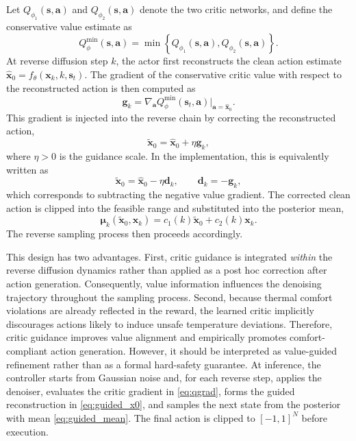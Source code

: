 \documentclass[lettersize,journal]{IEEEtran}
\theoremstyle{nonumberplain}     \theoremheaderfont{\bfseries\itshape}     \theorembodyfont{\normalfont}     \theoremseparator{:}     \theoremsymbol{\ensuremath{\blacksquare}}     \newtheorem{proof}{Proof}
\theoremstyle{plain}     \theoremheaderfont{\bfseries\itshape}     \theorembodyfont{\normalfont}     \theoremseparator{:}     \theoremsymbol{\ensuremath{\blacksquare}}     \newtheorem{remark}{Remark}
\begin{document}
Let $Q_{\phi_1}(\mathbf{s},\mathbf{a})$ and $Q_{\phi_2}(\mathbf{s},\mathbf{a})$ denote the two critic networks, and define the conservative value estimate as
\begin{equation}
Q_{\phi}^{\min}(\mathbf{s},\mathbf{a})
=
\min\left\{
Q_{\phi_1}(\mathbf{s},\mathbf{a}),
Q_{\phi_2}(\mathbf{s},\mathbf{a})
\right\}.
\label{eq:qmin}
\end{equation}
At reverse diffusion step $k$, the actor first reconstructs the clean action estimate $\hat{\mathbf{x}}_0 = f_\theta(\mathbf{x}_k,k,\mathbf{s}_t)$. The gradient of the conservative critic value with respect to the reconstructed action is then computed as
\begin{equation}
\mathbf{g}_k
=
\nabla_{\mathbf{a}} Q_{\phi}^{\min}(\mathbf{s}_t,\mathbf{a})
\big|_{\mathbf{a}=\hat{\mathbf{x}}_0}.
\label{eq:qgrad}
\end{equation}
This gradient is injected into the reverse chain by correcting the reconstructed action,
\begin{equation}
\tilde{\mathbf{x}}_0
=
\hat{\mathbf{x}}_0 + \eta \mathbf{g}_k,
\label{eq:guided_x0}
\end{equation}
where $\eta > 0$ is the guidance scale. In the implementation, this is equivalently written as
\begin{equation}
\tilde{\mathbf{x}}_0
=
\hat{\mathbf{x}}_0 - \eta \mathbf{d}_k,
\qquad
\mathbf{d}_k = -\mathbf{g}_k,
\label{eq:guided_impl}
\end{equation}
which corresponds to subtracting the negative value gradient. The corrected clean action is clipped into the feasible range and substituted into the posterior mean,
\begin{equation}
\boldsymbol{\mu}_k(\tilde{\mathbf{x}}_0,\mathbf{x}_k)
=
c_1(k)\tilde{\mathbf{x}}_0 + c_2(k)\mathbf{x}_k.
\label{eq:guided_mean}
\end{equation}
The reverse sampling process then proceeds accordingly.

This design has two advantages. First, critic guidance is integrated \emph{within} the reverse diffusion dynamics rather than applied as a post hoc correction after action generation. Consequently, value information influences the denoising trajectory throughout the sampling process. Second, because thermal comfort violations are already reflected in the reward, the learned critic implicitly discourages actions likely to induce unsafe temperature deviations. Therefore, critic guidance improves value alignment and empirically promotes comfort-compliant action generation. However, it should be interpreted as value-guided refinement rather than as a formal hard-safety guarantee.
At inference, the controller starts from Gaussian noise and, for each reverse step, applies the denoiser, evaluates the critic gradient in \eqref{eq:qgrad}, forms the guided reconstruction in \eqref{eq:guided_x0}, and samples the next state from the posterior with mean \eqref{eq:guided_mean}. The final action is clipped to $[-1,1]^N$ before execution.
\end{document}
